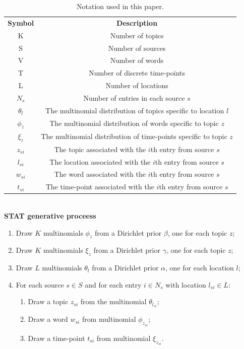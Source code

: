\documentclass[conference]{IEEEtran}
\newcommand{\model}{{STAT}\xspace} %
\begin{document}
\begin{table}
\small \centering
\caption{Notation used in this paper.}
\begin{tabular}{c c}
\hline
{\bf Symbol} & {\bf Description}  \\
K & Number of topics  \\
S & Number of sources \\
V & Number of words \\
T & Number of discrete time-points \\
L & Number of locations \\
$N_s$ & Number of entries in each source $s$\\
$\theta_l$ & The multinomial distribution of topics specific to location $l$\\
$\phi_z$ & The multinomial distribution of words specific to topic $z$\\
$\xi_z$ & The multinomial distribution of time-points specific to topic $z$\\
$z_{si}$ & The topic associated with the $i$th entry from source $s$ \\
$l_{si}$ & The location associated with the $i$th entry from source $s$ \\
$w_{si}$ & The word associated with the $i$th entry from source $s$ \\
$t_{si}$ & The time-point associated with the $i$th entry from source $s$ \\
\hline
\end{tabular}
\label{tab:notation}
\end{table}\vspace{-10pt}
\ \\{\bf \model generative proceess}
\begin{enumerate}
\item Draw $K$ multinomials $\phi_z$ from a Dirichlet prior $\beta$, one for each topic $z$;
\item Draw $K$ multinomials $\xi_z$ from a Dirichlet prior $\gamma$, one for each topic $z$;
\item Draw $L$ multinomials $\theta_l$ from a Dirichlet prior $\alpha$, one for each location $l$;
\item For each source  $s \in S$ and for each entry $i \in N_s$ with location $l_{si} \in L$:
\begin{enumerate}
\item Draw a topic $z_{si}$ from the multinomial $\theta_{l_{si}}$;
\item Draw a word $w_{si}$ from multinomial $\phi_{z_{si}}$;
\item Draw a time-point $t_{si}$ from multinomial $\xi_{z_{si}}$.
\end{enumerate}
\end{enumerate}
\end{document}
